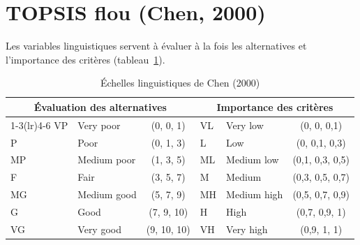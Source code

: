 \documentclass[11pt,a4paper]{report}
\theoremstyle{definition}
\theoremstyle{remark}
\begin{document}
\section{TOPSIS flou (Chen, 2000)}

Les variables linguistiques servent à évaluer à la fois les alternatives et l'importance des critères
(tableau~\ref{tab:chen}).

\begin{table}[H]
\centering
\caption{Échelles linguistiques de Chen (2000)}\label{tab:chen}
\begin{tabular}{llcllc}
\toprule
\multicolumn{3}{c}{\textbf{Évaluation des alternatives}} & \multicolumn{3}{c}{\textbf{Importance des critères}}\\
\cmidrule(lr){1-3}\cmidrule(lr){4-6}
VP & Very poor & (0, 0, 1) & VL & Very low & (0, 0, 0,1)\\
P & Poor & (0, 1, 3) & L & Low & (0, 0,1, 0,3)\\
MP & Medium poor & (1, 3, 5) & ML & Medium low & (0,1, 0,3, 0,5)\\
F & Fair & (3, 5, 7) & M & Medium & (0,3, 0,5, 0,7)\\
MG & Medium good & (5, 7, 9) & MH & Medium high & (0,5, 0,7, 0,9)\\
G & Good & (7, 9, 10) & H & High & (0,7, 0,9, 1)\\
VG & Very good & (9, 10, 10) & VH & Very high & (0,9, 1, 1)\\
\bottomrule
\end{tabular}
\end{table}
\end{document}
